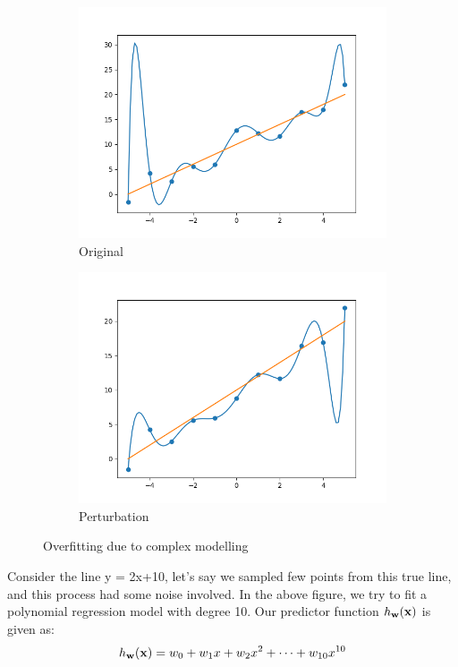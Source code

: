\begin{figure}[H]
  \begin{subfigure}{0.45\textwidth}
    \centering
    \includegraphics[scale=0.45]{images/07.png}
    \caption{Original}
  \end{subfigure}
  \hfill
  \begin{subfigure}{0.45\textwidth}
    \centering
    \includegraphics[scale=0.45]{images/08.png}
    \caption{Perturbation}
  \end{subfigure}
  \caption{Overfitting due to complex modelling}
\end{figure}

Consider the line y = 2x+10, let's say we sampled few points from this true line, and this process had some noise involved. In the above figure, we try to fit a polynomial regression model with degree 10. Our predictor function $h_{\mathbf{w}}(\mathbf{x})$ is given as:
$$
  h_{\mathbf{w}}(\mathbf{x}) = w_0 + w_1x + w_2x^2 + \dots + w_{10}x^{10}
$$

